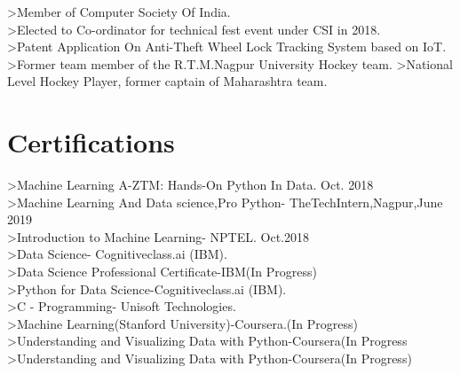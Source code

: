 \documentclass[]{deedy-resume-openfont}
\begin{document}
\begin{minipage}[t]{0.33\textwidth}
>Member of Computer Society Of India. \\

>Elected to Co-ordinator for technical fest event
under CSI in 2018. \\
>Patent Application On Anti-Theft Wheel Lock Tracking System based on IoT. \\
>Former team member of the R.T.M.Nagpur University Hockey team.
>National Level Hockey Player, former captain of Maharashtra team. \\


\section{Certifications}
>Machine Learning A-ZTM: Hands-On Python In Data.
Oct. 2018 \\

>Machine Learning And Data science,Pro Python- TheTechIntern,Nagpur,June 2019 \\

>Introduction to Machine Learning- NPTEL.
Oct.2018 \\

>Data Science- Cognitiveclass.ai (IBM). \\

>Data Science Professional Certificate-IBM(In Progress) \\
>Python for Data Science-Cognitiveclass.ai (IBM). \\
>C - Programming- Unisoft Technologies.\\
>Machine Learning(Stanford University)-Coursera.(In Progress) \\
>Understanding and Visualizing Data with Python-Coursera(In Progress\\
>Understanding and Visualizing Data with Python-Coursera(In Progress)\\

\end{minipage}%
\end{document}
